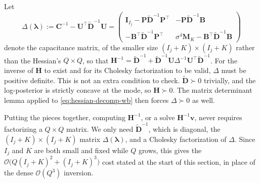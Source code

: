 Let
\begin{equation}
    \Delta\left(\bm{\lambda}\right):= \mathbf{C}^{-1} - \mathbf{U}^{\top}\tilde{\mathbf{D}}^{-1}\mathbf{U}
= \begin{pmatrix}
\mathbf{I}_{I_{j}} - \mathbf{P}\tilde{\mathbf{D}}^{-1}\mathbf{P}^{\top} & -\mathbf{P}\tilde{\mathbf{D}}^{-1}\mathbf{B} \\
-\mathbf{B}^{\top}\tilde{\mathbf{D}}^{-1}\mathbf{P}^{\top} & \sigma^4\mathbf{M}_K - \mathbf{B}^{\top}\tilde{\mathbf{D}}^{-1}\mathbf{B}
\end{pmatrix}
    \label{eq:capacitance}
\end{equation}
denote the capacitance matrix, of the smaller size $(I_{j}+K)\times (I_{j}+K)$ rather than the Hessian's $Q\times Q$, so that $\mathbf{H}^{-1}=\tilde{\mathbf{D}}^{-1}+\tilde{\mathbf{D}}^{-1}\mathbf{U}\Delta^{-1}\mathbf{U}^{\top}\tilde{\mathbf{D}}^{-1}$. For the inverse of $\mathbf H$ to exist and for its Cholesky factorization to be valid, $\Delta$ must be positive definite. This is not an extra condition to check. $\tilde{\mathbf D}\succ 0$ trivially, and the log-posterior is strictly concave at the mode, so $\mathbf H\succ 0$. The matrix determinant lemma applied to \eqref{eq:hessian-decomp-wb} then forces $\Delta\succ 0$ as well.

Putting the pieces together, computing $\mathbf{H}^{-1}$, or a solve $\mathbf{H}^{-1}\bm v$, never requires factorizing a $Q\times Q$ matrix. We only need $\tilde{\mathbf D}^{-1}$, which is diagonal, the $(I_j+K)\times(I_j+K)$ matrix $\Delta(\bm\lambda)$, and a Cholesky factorization of $\Delta$. Since $I_j$ and $K$ are both small and fixed while $Q$ grows, this gives the $\mathcal O\big(Q(I_j+K)^2+(I_j+K)^3\big)$ cost stated at the start of this section, in place of the dense $\mathcal O(Q^3)$ inversion.

